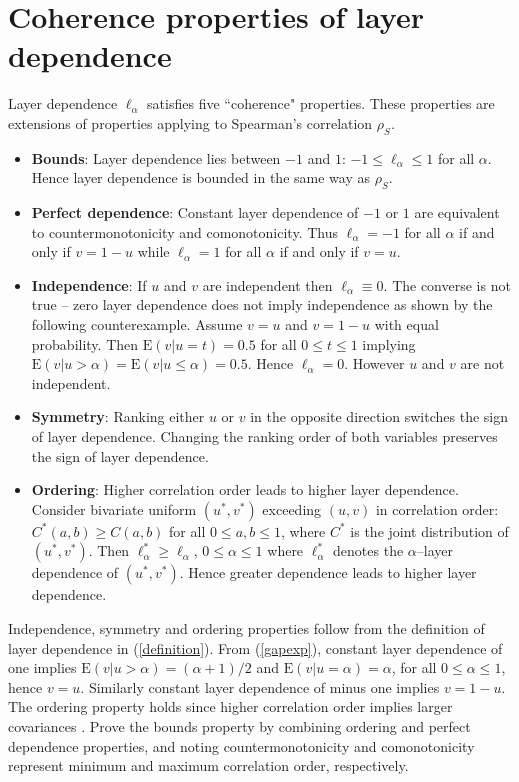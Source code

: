 \documentclass[authoryear]{elsarticle}
\newcommand{\E}{{\mathrm E}}
\newcommand{\eref}[1]{(\ref{#1})}
\begin{document}
\section{Coherence properties of layer dependence}\label{scoherence}


Layer dependence $\ell_\alpha$ satisfies five ``coherence" properties. These properties are  extensions of  properties applying to Spearman's correlation $\rho_S$.
\begin{itemize}

\item \textbf{Bounds}: Layer dependence lies between $-1$ and $1$: $-1 \le\ell_\alpha \le 1$ for all $\alpha$.
Hence layer dependence is bounded in the same way as  $\rho_S$.

\item \textbf{Perfect dependence}: Constant layer dependence of $-1$ or $1$ are equivalent to countermonotonicity and comonotonicity.
Thus $\ell_\alpha=-1$ for all $\alpha$ if and only if  $v=1-u$ while $\ell_\alpha=1$ for all $\alpha$ if and only if  $v=u$.

\item \textbf{Independence}: If $u$ and $v$ are independent then $\ell_\alpha\equiv 0$.   The converse is not true -- zero layer dependence does not imply independence as shown by the following counterexample. Assume $v=u$ and $v=1-u$ with equal probability. Then $\E(v|u=t)=0.5$ for all $0\leq t\leq 1$ implying $\E(v|u>\alpha)=\E(v|u\leq\alpha)=0.5$. Hence $\ell_\alpha=0$. However $u$ and $v$ are not independent.

\item \textbf{Symmetry}: Ranking either $u$ or $v$ in the opposite direction switches the sign of layer dependence. Changing the ranking order of both variables preserves the sign of layer dependence.

\item \textbf{Ordering}: Higher correlation order \citep{dhaene2009correlation} leads to higher layer dependence. Consider bivariate uniform $(u^*,v^*)$ exceeding $(u,v)$ in correlation order: $C^*(a,b)\geq C(a,b)$ for all $0\leq a,b\leq 1$, where $C^*$ is the joint distribution of $(u^*,v^*)$. Then
$
\ell^*_\alpha \geq \ell_\alpha$,   $0\leq\alpha\leq 1$
where $\ell_\alpha^*$ denotes the $\alpha$--layer dependence of $(u^*,v^*)$. Hence greater dependence leads to higher layer dependence.

\end{itemize}
Independence, symmetry and ordering properties follow from the definition of layer dependence in \eref{definition}. From \eref{gapexp}, constant layer dependence of one implies $\E(v|u>\alpha)=(\alpha+1)/2$ and $\E(v|u=\alpha)=\alpha$, for all $0\leq\alpha\leq 1$, hence $v=u$. Similarly constant layer dependence of minus one implies $v=1-u$. The ordering property holds since higher correlation order implies larger covariances \citep{dhaene2009correlation}. Prove the bounds property by combining ordering and perfect dependence properties, and noting countermonotonicity and comonotonicity represent minimum and maximum correlation order, respectively.
\end{document}
